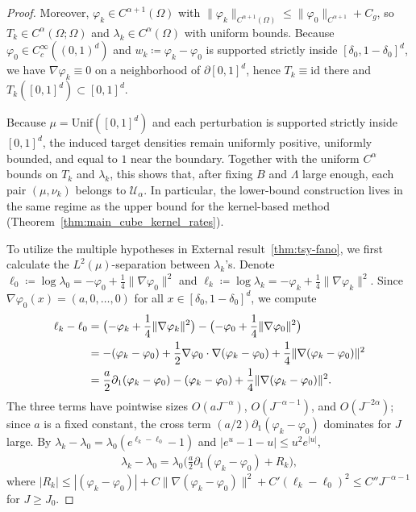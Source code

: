 \documentclass[11pt,reqno]{amsart}
\theoremstyle{definition}
\begin{document}
\begin{proof}
Moreover, $\varphi_k\in C^{\alpha+1}(\Omega)$ with $\|\varphi_k\|_{C^{\alpha+1}(\Omega)}\le\|\varphi_0\|_{C^{\alpha+1}}+C_g$, so $T_k\in C^\alpha(\Omega;\Omega)$ and $\lambda_k\in C^\alpha(\Omega)$ with uniform bounds. Because $\varphi_0\in C^\infty_c((0,1)^d)$ and $w_k\coloneqq \varphi_k-\varphi_0$ is supported strictly inside $[\delta_0,1-\delta_0]^d$, we have $\nabla \varphi_k\equiv 0$ on a neighborhood of $\partial[0,1]^d$, hence $T_k\equiv\mathrm{id}$ there and $T_k([0,1]^d)\subset[0,1]^d$. 


Because $\mu=\mathrm{Unif}([0,1]^d)$ and each perturbation is supported strictly inside $[0,1]^d$, the induced target densities remain uniformly positive, uniformly bounded, and equal to $1$ near the boundary. Together with the uniform $C^\alpha$ bounds on $T_k$ and $\lambda_k$, this shows that, after fixing $B$ and $\Lambda$ large enough, each pair $(\mu,\nu_k)$ belongs to $\mathcal U_\alpha$. In particular, the lower-bound construction lives in the same regime as the upper bound for the kernel-based method (Theorem~\ref{thm:main_cube_kernel_rates}).

To utilize the multiple hypotheses in External result~\ref{thm:tsy-fano}, we first calculate the $L^2(\mu)$-separation between $\lambda_k$'s. Denote $\ell_0 \coloneqq \log \lambda_0 = -\varphi_0+\frac1{4}\|\nabla \varphi_0\|^2$ and $\ell_k \coloneqq \log \lambda_k = -\varphi_k+\frac1{4}\|\nabla \varphi_k\|^2$. Since $\nabla \varphi_0(x)=(a,0,\dots,0)$ for all $x\in[\delta_0,1-\delta_0]^d$, we compute
\begin{align}
    \ell_k - \ell_0 &= \bigl(-\varphi_k+\frac1{4}\|\nabla \varphi_k\|^2\bigr) - \bigl(-\varphi_0+\frac1{4}\|\nabla \varphi_0\|^2\bigr) \notag\\
    &= -(\varphi_k-\varphi_0) + \frac1{2}\nabla \varphi_0\cdot\nabla(\varphi_k-\varphi_0) + \frac1{4}\|\nabla(\varphi_k-\varphi_0)\|^2 \\
    &= \frac{a}{2} \partial_1(\varphi_k-\varphi_0) - (\varphi_k-\varphi_0) + \frac1{4}\|\nabla(\varphi_k-\varphi_0)\|^2. \label{eq:u-expand}
\end{align}
The three terms have pointwise sizes $O(a J^{-\alpha})$, $O(J^{-\alpha-1})$, and $O(J^{-2\alpha})$; since $a$ is a fixed constant, the cross term ${ (a/2)}\partial_1(\varphi_k-\varphi_0)$ dominates for $J$ large. By $\lambda_k-\lambda_0=\lambda_0(e^{\ell_k-\ell_0}-1)$ and $|e^u-1-u|\le u^2 e^{|u|}$,
\begin{align}
    \lambda_k - \lambda_0 = \lambda_0\Big(\frac{a}{2} \partial_1(\varphi_k-\varphi_0) + R_k\Big), \label{eq:lambda-expand}
\end{align}
where $|R_k|\le |(\varphi_k-\varphi_0)|+C\|\nabla(\varphi_k-\varphi_0)\|^2+C'(\ell_k-\ell_0)^2\le C''J^{-\alpha-1}$ for $J\ge J_0$.


\end{proof}
\end{document}
